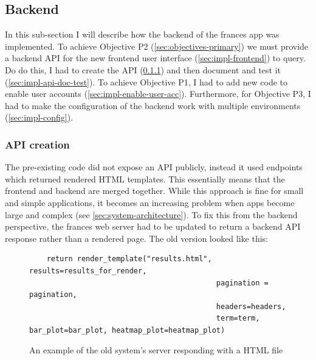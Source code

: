 \documentclass[12pt, letterpaper]{article}
\begin{document}
\subsection{Backend}\label{sec:impl-backend}

\begin{flushleft}
In this sub-section I will describe how the backend of the frances app was implemented. To achieve Objective P2 (\ref{sec:objectives-primary}) we must provide a backend API for the new frontend user interface (\ref{sec:impl-frontend}) to query. Do do this, I had to create the API (\ref{sec:api-creation}) and then document and test it (\ref{sec:impl-api-doc-test}). To achieve Objective P1, I had to add new code to enable user accounts (\ref{sec:impl-enable-user-acc}). Furthermore, for Objective P3, I had to make the configuration of the backend work with multiple environments (\ref{sec:impl-config}).
\end{flushleft}

\subsubsection{API creation}\label{sec:api-creation}

\begin{flushleft}
The pre-existing code did not expose an API publicly, instead it used endpoints which returned rendered HTML templates. This essentially means that the frontend and backend are merged together. While this approach is fine for small and simple applications, it becomes an increasing problem when apps become large and complex (see \ref{sec:system-architecture}). To fix this from the backend perspective, the frances web server had to be updated to return a backend API response rather than a rendered page. The old version looked like this:
\end{flushleft}

\begin{flushleft}
\begin{figure}[H]
\begin{verbatim}
    return render_template("results.html", results=results_for_render,
                                           pagination = pagination, 
                                           headers=headers,
                                           term=term, bar_plot=bar_plot, heatmap_plot=heatmap_plot)
\end{verbatim}
\caption{An example of the old system's server responding with a HTML file}
\end{figure}
\end{flushleft}
\end{document}
